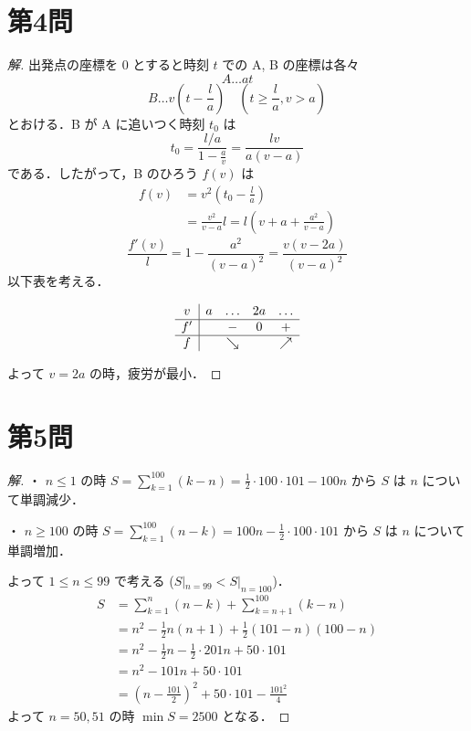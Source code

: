 \documentclass[../main.tex]{subfiles}
\begin{document}
\newpage

\section*{第4問}

\begin{proof}[解]
  出発点の座標を $0$ とすると時刻 $t$ での A, B の座標は各々
  \[
    A \dots a t
  \]
  \[
    B \dots v\left(t - \frac{l}{a}\right) \quad \left(t \ge \frac{l}{a}, v > a\right)
  \]
  とおける．B が A に追いつく時刻 $t_0$ は
  \[
    t_0 = \frac{l/a}{1 - \frac{a}{v}} = \frac{l v}{a(v-a)}
  \]
  である．したがって，B のひろう $f(v)$ は
  \begin{align*}
    f(v) &= v^2 \left(t_0 - \frac{l}{a}\right) \\
    &= \frac{v^2}{v-a} l = l \left(v + a + \frac{a^2}{v-a}\right)
  \end{align*}
  \[
    \frac{f'(v)}{l} = 1 - \frac{a^2}{(v-a)^2} = \frac{v(v-2a)}{(v-a)^2}
  \]
  以下表を考える．

  \[
    \begin{array}{c|c*3{c}}
      v & a & \dots & 2a & \dots \\ \hline
      f' & & - & 0 & + \\ \hline
      f & & \searrow & & \nearrow
    \end{array}
  \]

  よって $v = 2a$ の時，疲労が最小．
\end{proof}

\newpage

\section*{第5問}

\begin{proof}[解]
  ・ $n \le 1$ の時 $S = \sum_{k=1}^{100} (k-n) = \frac{1}{2} \cdot 100 \cdot 101 - 100 n$ から $S$ は $n$ について単調減少．

  ・ $n \ge 100$ の時 $S = \sum_{k=1}^{100} (n-k) = 100 n - \frac{1}{2} \cdot 100 \cdot 101$ から $S$ は $n$ について単調増加．

  よって $1 \le n \le 99$ で考える ($S|_{n=99} < S|_{n=100}$)．
  \begin{align*}
    S &= \sum_{k=1}^n (n-k) + \sum_{k=n+1}^{100} (k-n) \\
    &= n^2 - \frac{1}{2} n(n+1) + \frac{1}{2}(101-n)(100-n) \\
    &= n^2 - \frac{1}{2} n - \frac{1}{2} \cdot 201 n + 50 \cdot 101 \\
    &= n^2 - 101 n + 50 \cdot 101 \\
    &= \left(n - \frac{101}{2}\right)^2 + 50 \cdot 101 - \frac{101^2}{4}
  \end{align*}
  よって $n = 50, 51$ の時 $\min S = 2500$ となる．
\end{proof}
\end{document}
